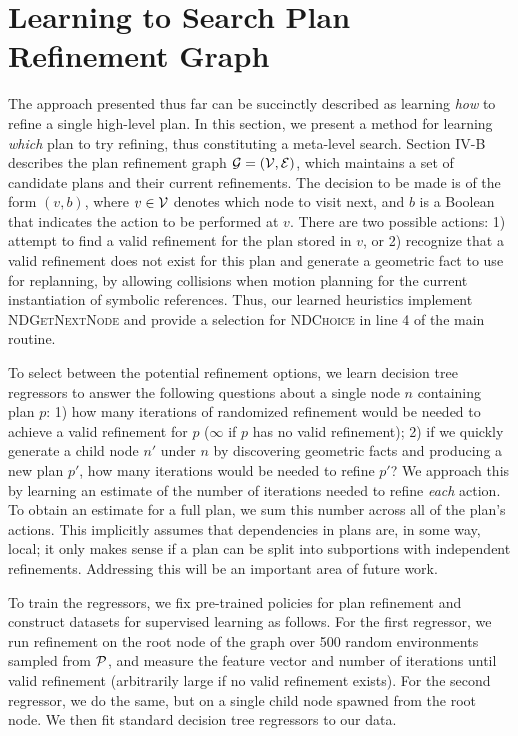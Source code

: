 \section{Learning to Search Plan Refinement Graph}
The approach presented thus far can be succinctly described as learning \emph{how} to
refine a single high-level plan. In this section, we present a method for learning
\emph{which} plan to try refining, thus constituting a meta-level search. Section IV-B describes the plan refinement graph $\mathcal{G} = (\mathcal{V}, \mathcal{E})$,
which maintains a set of candidate plans and their current refinements. The decision to be made is of the form $(v, b)$,
where $v \in \mathcal{V}$ denotes which node to visit next, and $b$ is a Boolean that indicates the action
to be performed at $v$. There are two possible actions: 1) attempt to find a valid refinement
for the plan stored in $v$, or 2) recognize that a valid refinement does not exist for this plan
and generate a geometric fact to use for replanning, by allowing collisions when motion planning
for the current instantiation of symbolic references. Thus, our learned heuristics implement
\textsc{NDGetNextNode} and provide a selection for \textsc{NDChoice} in line 4 of the main routine.

To select between the potential refinement options, we learn decision tree regressors
to answer the following questions about a single node $n$ containing plan $p$: 1) how many iterations of randomized refinement
would be needed to achieve a valid refinement for $p$ ($\infty$ if $p$ has no valid refinement); 2)
if we quickly generate a child node $n'$ under $n$ by discovering geometric facts and producing a new plan $p'$,
how many iterations would be needed to refine $p'$? We approach this by learning an estimate of the
number of iterations needed to refine \emph{each} action. To obtain an estimate for a full plan, we
sum this number across all of the plan's actions. This implicitly assumes that dependencies in plans are, in some way, local;
it only makes sense if a plan can be split into subportions with independent refinements.
Addressing this will be an important area of future work.

To train the regressors, we fix pre-trained policies for plan refinement and construct datasets
for supervised learning as follows. For the first regressor, we run refinement on the root
node of the graph over 500 random environments sampled from $\mathcal{P}$, and measure the feature vector and number of iterations
until valid refinement (arbitrarily large if no valid refinement exists).
For the second regressor, we do the same, but on a single child node spawned from the root node.
We then fit standard decision tree regressors to our data.

